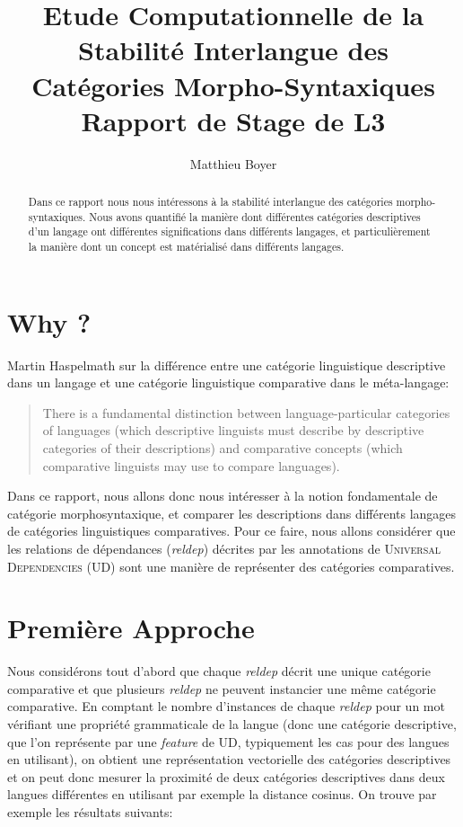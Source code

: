 \documentclass{cours}
\title{{\sc Etude Computationnelle de la Stabilité Interlangue des Catégories Morpho-Syntaxiques}\\
{\small Rapport de Stage de L3} }
\author{Matthieu Boyer}
\newcommand{\codedir}{Morphosyntactic-Categories_Code}
\begin{document}
\begin{abstract}
	Dans ce rapport nous nous intéressons à la stabilité interlangue des catégories morpho-syntaxiques.
	Nous avons quantifié la manière dont différentes catégories descriptives d'un langage ont différentes significations dans différents langages,
	et particulièrement la manière dont un concept est matérialisé dans différents langages.
\end{abstract}

\section{Why ?}
Martin Haspelmath sur la différence entre une catégorie linguistique descriptive dans un langage et une catégorie linguistique comparative dans le méta-langage:
\begin{quote}
	There is a fundamental distinction between language-particular categories of languages (which descriptive linguists must describe by descriptive categories of their descriptions) and comparative concepts (which comparative linguists may use to compare languages).
\end{quote}
{}
Dans ce rapport, nous allons donc nous intéresser à la notion fondamentale de catégorie morphosyntaxique, et comparer les descriptions dans différents langages de catégories linguistiques comparatives.
Pour ce faire, nous allons considérer que les relations de dépendances (\textit{reldep}) décrites par les annotations de \textsc{Universal Dependencies} (UD) sont une manière de représenter des catégories comparatives.

\section{Première Approche}
Nous considérons tout d'abord que chaque \textit{reldep} décrit une unique catégorie comparative et que plusieurs \textit{reldep} ne peuvent instancier une même catégorie comparative.
En comptant le nombre d'instances de chaque \textit{reldep} pour un mot vérifiant une propriété grammaticale de la langue (donc une catégorie descriptive, que l'on représente par une \textit{feature} de UD, typiquement les cas pour des langues en utilisant), on obtient une représentation vectorielle des catégories descriptives et on peut donc mesurer la proximité de deux catégories descriptives dans deux langues différentes en utilisant par exemple la distance cosinus.
On trouve par exemple les résultats suivants:







\end{document}
